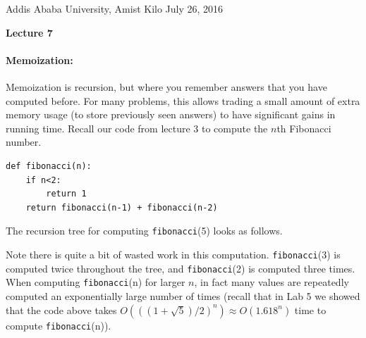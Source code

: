 \documentclass[11pt]{article}
\newlength{\toppush}
\newcommand{\htitle}[2]{\noindent\vspace*{-\toppush}\newline\parbox{6.5in}
 {\large Addis Ababa University, Amist Kilo \hfill #1\newline
\hspace*{\fill}{\bf Algorithms and Programming for High Schoolers} \hspace*{\fill} \newline
\mbox{}\hrulefill\mbox{}}\vspace*{1ex}\mbox{}\newline
\begin{center}{\Large\bf #2}\end{center}}
\begin{document}
\htitle{July 26, 2016}{Lecture 7}

\paragraph{\Large Memoization:}

Memoization is recursion, but where you remember answers that you have
computed before.  For many problems, this allows trading a small
amount of extra memory
usage (to store previously seen answers) to have significant gains in
running time.
Recall our code from lecture 3 to compute the $n$th
Fibonacci number.

\begin{verbatim}
def fibonacci(n):
    if n<2:
        return 1
    return fibonacci(n-1) + fibonacci(n-2)
\end{verbatim}

The recursion tree for computing \texttt{fibonacci}(5) looks as
follows.

\begin{figure}[!!h]
\begin{center}
\end{center}
\end{figure}

Note there is quite a bit of wasted work in this computation.
\texttt{fibonacci}(3) is computed twice throughout the tree, and
\texttt{fibonacci}(2) is computed three times.  When computing
\texttt{fibonacci}(n) for larger $n$, in fact many values are
repeatedly computed an exponentially large number of times (recall
that in Lab 5 we showed that the code above takes
$O(((1+\sqrt{5})/2)^n) \approx O(1.618^n)$ time to compute
\texttt{fibonacci}(n)).
\end{document}

